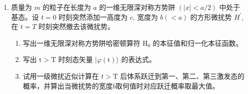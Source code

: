 \begin{enumerate}
{\begin{enumerate}
		\item 对 $\vec{\mathscr E}=-\mathscr E\,\vec e_x$ 可取
		$\Phi=\mathscr E r\cos\varphi$，故电荷 $-e$ 的微扰为
		$H'=-e\mathscr E r\cos\varphi$。记 $C=e\mathscr E r$，则
		\[
			\langle n'|H'|n\rangle=-\frac C2
			(\delta_{n',n+1}+\delta_{n',n-1}).
		\]
		在 $n=\pm1$ 和 $n=\pm2$ 各子空间中，一级矩阵均为零。
		二级有效矩阵的定义为
		\[
		 W^{(2)}_{ab}=\sum_{k\notin\mathcal D}
		 \frac{H'_{ak}H'_{kb}}{E^{(0)}-E_k^{(0)}}.
		\]
		对 $n=1$，对角元只有 $k=0,2$ 两项：
		$C^2[1/\varepsilon-1/(3\varepsilon)]/4=C^2/(6\varepsilon)$。
		$1$ 与 $-1$ 之间只有共同中间态 $k=0$，故非对角元为 $C^2/(4\varepsilon)$。
		因此第一激发子空间的二级有效矩阵为
		\[
			\frac{C^2}{\varepsilon}
			\begin{pmatrix}\frac16&\frac14\\[2pt]\frac14&\frac16\end{pmatrix}.
		\]
		所以由 $\cos\varphi$、$\sin\varphi$ 描写的两个实组合分别有
		\[
			\boxed{E_{1,\cos}=\varepsilon+\frac{5C^2}{12\varepsilon}},
			\qquad
			\boxed{E_{1,\sin}=\varepsilon-\frac{C^2}{12\varepsilon}}.
		\]
		对 $n=2$，对角元来自 $k=1,3$：
		$C^2[1/(3\varepsilon)-1/(5\varepsilon)]/4=C^2/(30\varepsilon)$。
		$2$ 与 $-2$ 不能通过一次中间跃迁相连，非对角元为零，所以到二级不分裂，二者均为
		\[
			\boxed{E_{2,\pm}=4\varepsilon+\frac{C^2}{30\varepsilon}}.
		\]
	\end{enumerate}
}


\item 
质量为 $m$ 的粒子在长度为 $a$ 的一维无限深对称方势阱 $(|x|<a / 2)$ 中处于
基态。设 $t=0$ 时刻突然添加一高度为 $c$, 宽度为 $b(<a)$ 的方形微扰势 $H^{\prime}$, 在 $t=T$ 时刻突然撤去该微扰势。
\begin{enumerate}
	\item
	写出一维无限深对称方势阱哈密顿算符 $\mathrm{H}_{0}$ 的本征值和归一化本征函数。
	\item 
	写出 $\mathrm{t}>\mathrm{T}$ 时刻态矢量 $|\varphi(\mathrm{t})\rangle$ 的表达式。
	\item 
	试用一级微扰近似计算在 $t>\mathrm{T}$ 后体系跃迁到第一、第二、第三激发态的概率，并算出当微扰势的宽度$ b $取何值时对应跃迁概率取最大值。
	
	
	
\end{enumerate}


\end{enumerate}
